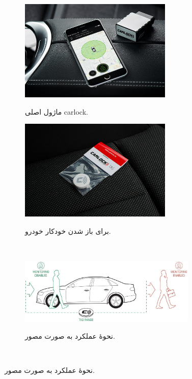 \documentclass[a4paper,12pt]{report}
\begin{document}
	\begin{figure}[!h]
		\centering
		\footnotesize
		\begin{subfigure}[t]{0.3\linewidth}
			\centering
			\includegraphics[width=0.8\textwidth]{resources/carlock-main-module.jpg}
			\label{subfig1:fig1:subsec3:sec3:chap1}
			\caption{
				ماژول اصلی
				carlock.
			}
		\end{subfigure}
		\hspace*{1cm}
		\begin{subfigure}[t]{0.3\linewidth}
			\centering
			\includegraphics[width=0.8\textwidth]{resources/carlock-tag.jpg}
			\label{subfig2:fig1:subsec3:sec3:chap1}
			\caption{
			برای باز شدن خودکار خودرو.
			}
		\end{subfigure}\\
		\begin{subfigure}[t]{0.8\linewidth}
			\centering
			\includegraphics[width=0.93\textwidth]{resources/carlock-tag-functionality.jpg}
			\label{subfig1:fig2:subsec3:sec3:chap1}
			\caption{
				نحوهٔ عملکرد
				به صورت مصور.
			}
		\end{subfigure}\\\vspace*{5mm}


\end{figure}
\end{document}
